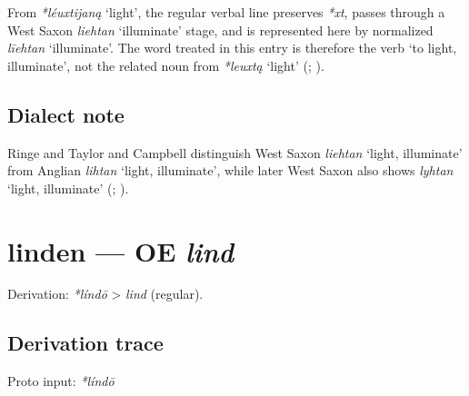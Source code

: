 \documentclass[
  british,
  a4paper,
  openany]{book}
\providecommand{\Recon}[1]{\emph{*#1}}
{\catcode`→=\active \global\def→{\ensuremath{\rightarrow}}}
\providecommand{\texorpdfstring}[2]{#1}
\providecommand{\Recon}[1]{\emph{*#1}}
{\catcode`→=\active \global\def→{\ensuremath{\rightarrow}}}
\begin{document}
From \Recon{léuxtijaną} `light', the regular verbal line preserves
\emph{*xt}, passes through a West Saxon \emph{liehtan} `illuminate'
stage, and is represented here by normalized \emph{līehtan}
`illuminate'. The word treated in this entry is therefore the verb `to
light, illuminate', not the related noun from \Recon{leuxtą} `light'
(;
).

\subsection{Dialect note}\label{dialect-note-3}

Ringe and Taylor and Campbell distinguish West Saxon {\emph{liehtan}}
`light, illuminate' from Anglian {\emph{lihtan}} `light, illuminate',
while later West Saxon also shows {\emph{lyhtan}} `light, illuminate'
(;
).

\section{\texorpdfstring{linden --- OE
\emph{lind}}{linden --- OE lind}}\label{linden-oe-lind}


Derivation: \emph{*líndō} \textgreater{} \emph{lind} (regular).

\subsection{Derivation trace}\label{derivation-trace-37}

Proto input: \emph{*líndō}

\begingroup
\setlength{\fboxsep}{6pt}
\end{document}
